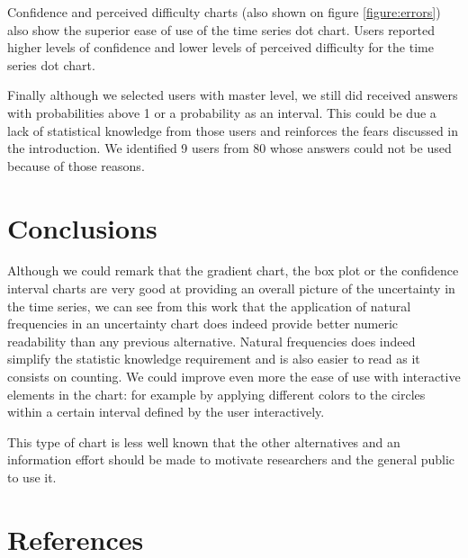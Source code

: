 \documentclass[a4paper,3p,sort&compress]{elsarticle}
\begin{document}
Confidence and perceived difficulty charts (also shown on figure \ref{figure:errors}) also show the superior ease of use 
of the time series dot chart. Users reported higher levels of confidence and 
lower levels of perceived difficulty for the time series dot chart.


Finally although we selected users with master level, we still did received answers with probabilities 
above 1 or a probability as an interval. This could be due a lack of statistical knowledge from those 
users and reinforces the fears discussed in the introduction. 
We identified 9 users from 80 whose answers could not be used because of those reasons.

\section{Conclusions}
\label{sec:concl}

Although we could remark that the gradient chart, the box plot or the confidence interval charts are very good at 
providing an overall picture of the uncertainty in the time series, we can see from this work that the application of natural 
frequencies in an uncertainty chart does indeed
provide better numeric readability than any previous alternative. Natural frequencies does indeed simplify 
the statistic knowledge requirement and is also easier to read as it consists on counting.
We could improve even more the ease of use with interactive elements in the chart: for example
by applying different colors to the circles within a certain interval defined by the user interactively.

This type of chart is less well known that the other alternatives and an information effort should be made to motivate 
researchers and the general public to use it.




\section{References}
\label{sec:ref}



\end{document}

